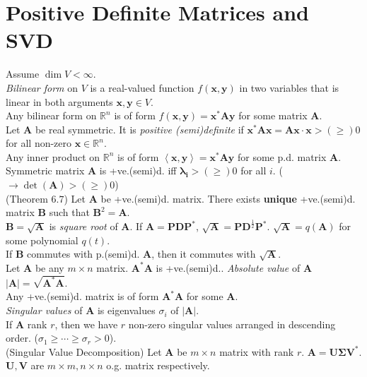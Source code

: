 \documentclass{article}
\theoremstyle{definition}
\begin{document}
\section{Positive Definite Matrices and SVD}
Assume $\dim{V}<\infty$.\\
\textit{Bilinear form} on $V$ is a real-valued function $f(\mathbf{x},\mathbf{y})$ in two variables that is linear in both arguments $\mathbf{x},\mathbf{y}\in V$.\\
Any bilinear form on $\mathbb{R}^{n}$ is of form $f(\mathbf{x},\mathbf{y})=\mathbf{x}^{*}\mathbf{Ay}$ for some matrix $\mathbf{A}$.\\
Let $\mathbf{A}$ be real symmetric. It is \textit{positive (semi)definite} if $\mathbf{x}^{*}\mathbf{Ax}=\mathbf{Ax}\cdot\mathbf{x}>(\geq)0$ for all non-zero $\mathbf{x}\in \mathbb{R}^{n}$.\\
Any inner product on $\mathbb{R}^{n}$ is of form $\left<\mathbf{x},\mathbf{y}\right>=\mathbf{x}^{*}\mathbf{Ay}$ for some p.d. matrix $\mathbf{A}$.\\
Symmetric matrix $\mathbf{A}$ is +ve.(semi)d. iff $\mathbf{\lambda_{i}}>(\geq)0$ for all $i$. ($\rightarrow\det(\mathbf{A})>(\geq)0$)\\
(Theorem $6.7$) Let $\mathbf{A}$ be +ve.(semi)d. matrix. There exists \textbf{unique} +ve.(semi)d. matrix $\mathbf{B}$ such that $\mathbf{B}^{2}=\mathbf{A}$.\\
$\mathbf{B}=\sqrt{\mathbf{A}}$ is \textit{square root} of $\mathbf{A}$. If $\mathbf{A}=\mathbf{PDP}^{*}$, $\sqrt{\mathbf{A}}=\mathbf{PD}^{\frac{1}{2}}\mathbf{P}^{*}$. $\sqrt{\mathbf{A}}=q(\mathbf{A})$ for some polynomial $q(t)$.\\
If $\mathbf{B}$ commutes with p.(semi)d. $\mathbf{A}$, then it commutes with $\sqrt{\mathbf{A}}$.\\
Let $\mathbf{A}$ be any $m\times n$ matrix. $\mathbf{A}^{*}\mathbf{A}$ is +ve.(semi)d.. \textit{Absolute value} of $\mathbf{A}$ $\left|\mathbf{A}\right|=\sqrt{\mathbf{A}^{*}\mathbf{A}}$.\\
Any +ve.(semi)d. matrix is of form $\mathbf{A}^{*}\mathbf{A}$ for some $\mathbf{A}$.\\
\textit{Singular values} of $\mathbf{A}$ is eigenvalues $\sigma_{i}$ of $\left|\mathbf{A}\right|$.\\
If $\mathbf{A}$ rank $r$, then we have $r$ non-zero singular values arranged in descending order. ($\sigma_{1}\geq\cdots\geq\sigma_{r}>0$).\\
(Singular Value Decomposition) Let $\mathbf{A}$ be $m\times n$ matrix with rank $r$. $\mathbf{A}=\mathbf{U\Sigma V}^{*}$. $\mathbf{U},\mathbf{V}$ are $m\times m,n\times n$ o.g. matrix respectively.\\
\end{document}
